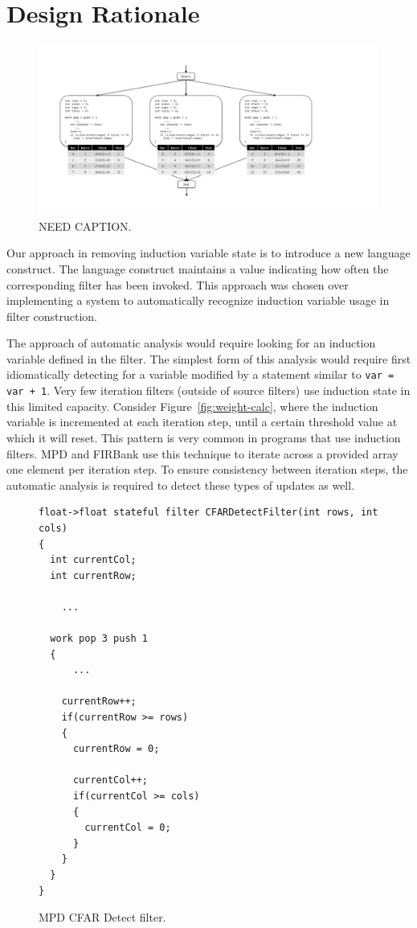 \section{Design Rationale}

\begin{figure}[t!]
\centering
\includegraphics[width=6.5in]{figures/fission-example.pdf}
\caption{NEED CAPTION.\protect\label{fig:fission-example}}
\end{figure}

Our approach in removing induction variable state is to introduce a new language construct.  The language construct maintains a value indicating how often the corresponding filter has been invoked.  This approach was chosen over implementing a system to automatically recognize induction variable usage in filter construction.

The approach of automatic analysis would require looking for an induction variable defined in the filter.  The simplest form of this analysis would require first idiomatically detecting for a variable modified by a statement similar to \texttt{var = var + 1}.  Very few iteration filters (outside of source filters) use induction state in this limited capacity.  Consider Figure~\ref{fig:weight-calc}, where the induction variable is incremented at each iteration step, until a certain threshold value at which it will reset.  This pattern is very common in programs that use induction filters.  MPD and FIRBank use this technique to iterate across a provided array one element per iteration step.  To ensure consistency between iteration steps, the automatic analysis is required to detect these types of updates as well.  

\begin{figure}[t]
{\eightpoint
\begin{verbatim}
float->float stateful filter CFARDetectFilter(int rows, int cols)
{
  int currentCol;
  int currentRow;

    ...

  work pop 3 push 1
  {
      ...

    currentRow++;
    if(currentRow >= rows)
    {
      currentRow = 0;

      currentCol++;
      if(currentCol >= cols)
      {
        currentCol = 0;
      }
    }
  }
}
\end{verbatim}
\caption{MPD CFAR Detect filter.\protect\label{fig:cfar-detect-filter}}}
\end{figure}

